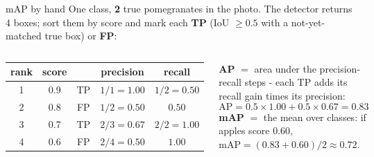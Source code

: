 \documentclass[aspectratio=169]{beamer}
\begin{document}
\begin{frame}{mAP by hand}
  \small
  One class, \textbf{2} true pomegranates in the photo. The detector returns 4 boxes;
  sort them by score and mark each \textbf{TP} (IoU $\ge 0.5$ with a not-yet-matched true
  box) or \textbf{FP}:
  \vskip 4pt
  \begin{columns}[T]
    \begin{center}\footnotesize
      \begin{tabular}{c c c c c}
        \textbf{rank} & \textbf{score} & & \textbf{precision} & \textbf{recall}\\
        \hline
        1 & 0.9 & TP & $1/1 = 1.00$ & $1/2 = 0.50$\\
        2 & 0.8 & FP & $1/2 = 0.50$ & $0.50$\\
        3 & 0.7 & TP & $2/3 = 0.67$ & $2/2 = 1.00$\\
        4 & 0.6 & FP & $2/4 = 0.50$ & $1.00$\\
      \end{tabular}
    \end{center}
    \textbf{AP} $=$ area under the precision-recall steps - each TP adds its recall gain
    times its precision:
    \[
      \text{AP} = 0.5 \times 1.00 + 0.5 \times 0.67 = \mathbf{0.83}
    \]
    \textbf{mAP} $=$ the mean over classes: if apples score $0.60$,
    $\text{mAP} = (0.83 + 0.60)/2 \approx 0.72$.
  \end{columns}
  \vskip 6pt
\end{frame}

\end{document}
